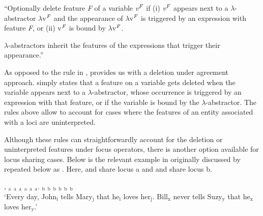 \documentclass[output=paper,
modfonts
]{langscibook}
\begin{document}
\begin{exe}
	\ex 
	\begin{xlist} 
		
		\ex \label{ex:irani:75a}``Optionally delete feature \textit{F} of a variable \textit{v$^\text{\textit{F}}$} if (i) \textit{v$^\text{\textit{F}}$} appears next to a \(\lambda\)-abstractor \(\lambda\)v$^\text{\textit{F}}$ and the appearance of \(\lambda\)v$^\text{\textit{F}}$ is triggered by an expression with feature \textit{F}, or (ii) v$^\text{\textit{F}}$ is bound by \(\lambda\)v$^\text{\textit{F}}$.
		
		\ex \(\lambda\)-abstractors inherit the features of the expressions that trigger their appearance.'' \citep[1071]{Schlenker2014}
	\end{xlist}
	
\end{exe} 

As opposed to the rule in ,  provides us with a deletion under agreement approach.  simply states that a feature on a variable gets deleted when the variable appears next to a \(\lambda\)-abstractor, whose occurrence is triggered by an expression with that feature, or if the variable is bound by the \(\lambda\)-abstractor. The rules above allow to account for cases where the features of an entity associated with a loci are uninterpreted. 

Although these rules can straightforwardly account for the deletion or uninterpreted features under focus operators, there is another option available for locus sharing cases. Below is the relevant example in  originally discussed by \citet{Kuhn2015} repeated below as . Here,  and  share locus a and  and  share locus b. 

\begin{exe} 
	\ex \label{ex:irani:76} , $_\text{a}$ $_\text{a}$  $_\text{a}$ $_\text{a}$ $_\text{a}$  $_\text{a}$. $_\text{b}$ $_\text{b}$  $_\text{b}$ $_\text{b}$ $_\text{b}$  $_\text{b}$ \\
	`Every day, John$_\text{i}$ tells Mary$_\text{j}$ that he$_\text{i}$ loves her$_\text{j}$. Bill$_\text{x}$ never tells Suzy$_\text{y}$ that he$_\text{x}$ loves her$_\text{y}$.' \citep[1073]{Schlenker2014}
\end{exe} 
\end{document}
